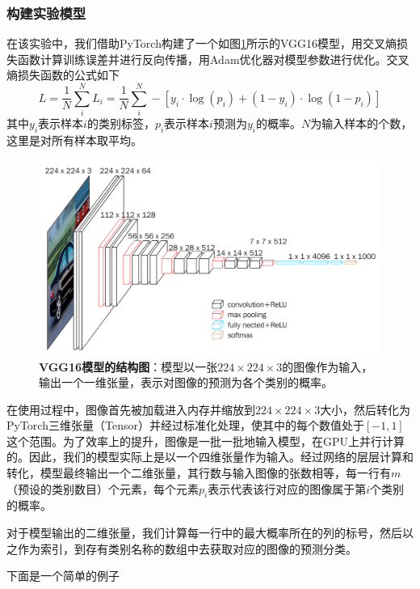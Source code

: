 \subsubsection{构建实验模型}\label{vgg16model}
在该实验中，我们借助PyTorch\cite{DLWP}构建了一个如图\ref{fig:vgg16}所示的VGG16模型\cite{vgg16}，用交叉熵损失函数\cite{DL, DLWP}计算训练误差并进行反向传播，用Adam优化器\cite{DL, DLWP}对模型参数进行优化。交叉熵损失函数的公式如下
\begin{equation}\label{equ:CrossEntropyErrorFunction}
L=\frac{1}{N} \sum_{i}^{N} L_{i}=\frac{1}{N} \sum_{i}^{N} -\left[y_{i} \cdot \log \left(p_{i}\right)+\left(1-y_{i}\right) \cdot \log \left(1-p_{i}\right)\right]
\end{equation}
其中$y_i$表示样本$i$的类别标签，$p_i$表示样本$i$预测为$y_i$的概率。$N$为输入样本的个数，这里是对所有样本取平均。

\begin{figure}[H]
	\centering
	\includegraphics[width=0.8\linewidth]{../figures/vgg16.png}
	\caption{\textbf{VGG16模型的结构图}：模型以一张$224 \times 224 \times 3$的图像作为输入，输出一个一维张量，表示对图像的预测为各个类别的概率。}
	\label{fig:vgg16}
\end{figure}

在使用过程中，图像首先被加载进入内存并缩放到$224 \times 224 \times 3$大小，然后转化为PyTorch三维张量（Tensor）\cite{DLWP}并经过标准化处理，使其中的每个数值处于$[-1, 1]$这个范围。为了效率上的提升，图像是一批一批地输入模型，在GPU上并行计算的。因此，我们的模型实际上是以一个四维张量作为输入。经过网络的层层计算和转化，模型最终输出一个二维张量，其行数与输入图像的张数相等，每一行有$m$（预设的类别数目）个元素，每个元素$p_i$表示代表该行对应的图像属于第$i$个类别的概率。

对于模型输出的二维张量，我们计算每一行中的最大概率所在的列的标号，然后以之作为索引，到存有类别名称的数组中去获取对应的图像的预测分类。

下面是一个简单的例子

